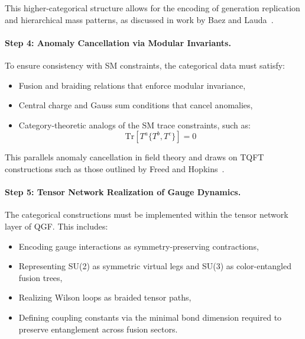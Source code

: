 \documentclass[11pt]{article}
\begin{document}
This higher-categorical structure allows for the encoding of generation replication and hierarchical mass patterns, as discussed in work by Baez and Lauda~\cite{baez2007higher}.

\paragraph{Step 4: Anomaly Cancellation via Modular Invariants.}

To ensure consistency with SM constraints, the categorical data must satisfy:
\begin{itemize}
    \item Fusion and braiding relations that enforce modular invariance,
    \item Central charge and Gauss sum conditions that cancel anomalies,
    \item Category-theoretic analogs of the SM trace constraints, such as:
    \[
    \text{Tr}[T^a \{T^b, T^c\}] = 0
    \]
\end{itemize}
This parallels anomaly cancellation in field theory and draws on TQFT constructions such as those outlined by Freed and Hopkins~\cite{freed2016}.

\paragraph{Step 5: Tensor Network Realization of Gauge Dynamics.}

The categorical constructions must be implemented within the tensor network layer of QGF. This includes:
\begin{itemize}
    \item Encoding gauge interactions as symmetry-preserving contractions,
    \item Representing SU(2) as symmetric virtual legs and SU(3) as color-entangled fusion trees,
    \item Realizing Wilson loops as braided tensor paths,
    \item Defining coupling constants via the minimal bond dimension required to preserve entanglement across fusion sectors.
\end{itemize}
\usetikzlibrary{arrows.meta, positioning}
\end{document}
